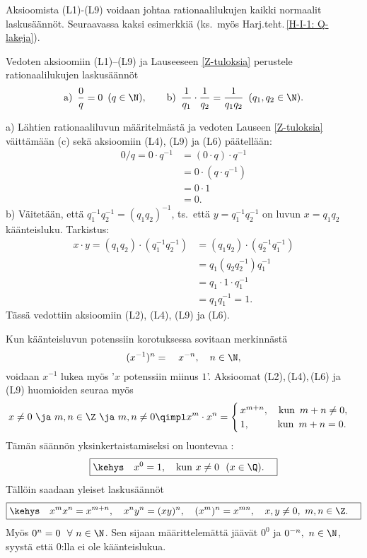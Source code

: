 Aksioomista (L1)-(L9) voidaan johtaa rationaalilukujen kaikki normaalit laskusäännöt.
Seuraavassa kaksi esimerkkiä (ks.\ myös Harj.teht.\,\ref{H-I-1: Q-lakeja}).
\begin{Exa} \label{kaksi Q-lakia}
Vedoten aksioomiin (L1)--(L9) ja Lauseeseen \ref{Z-tuloksia} perustele rationaalilukujen
laskusäännöt
\[
\text{a)}\,\ \frac{0}{q}=0\,\ (q\in\N), \qquad 
\text{b)}\,\ \frac{1}{q_1}\cdot\frac{1}{q_2} = \frac{1}{q_1q_2}\,\ (q_1,q_2\in\N).
\]
\end{Exa}
\ratk a) Lähtien rationaaliluvun määritelmästä ja vedoten Lauseen \ref{Z-tuloksia}
väittämään (c) sekä aksioomiin (L4), (L9) ja (L6) päätellään:
\begin{align*}
0/q = 0 \cdot q^{-1} &= (0 \cdot q)\cdot q^{-1} \\
                     &= 0\cdot(q \cdot q^{-1}) \\
                     &= 0 \cdot 1 \\
                     &= 0.
\end{align*}
b) Väitetään, että $q_1^{-1}q_2^{-1}=(q_1q_2)^{-1}$, ts.\ että $y=q_1^{-1}q_2^{-1}$ on luvun
$x=q_1q_2$ käänteisluku. Tarkistus:
\begin{align*}
x \cdot y = (q_1q_2)\cdot(q_1^{-1}q_2^{-1}) &= (q_1q_2)\cdot(q_2^{-1}q_1^{-1}) \\
                                            &= q_1(q_2q_2^{-1})q_1^{-1} \\
                                            &= q_1 \cdot 1 \cdot q_1^{-1} \\
                                            &= q_1q_1^{-1} = 1. 
\end{align*}
Tässä vedottiin aksioomiin (L2), (L4), (L9) ja (L6). \loppu

Kun käänteisluvun potenssiin korotuksessa sovitaan merkinnästä
\[
(x^{-1})^n = \quad x^{-n}, \quad n \in \N,
\]
voidaan $x^{-1}$ lukea myös '$x$ potenssiin miinus $1$'. Aksioomat (L2),\,(L4),\,(L6) ja (L9)
huomioiden seuraa myös 
\[
x \neq 0\ \ja\ m,n \in \Z\ \ja\ m,n \neq 0 
                         \qimpl x^m \cdot x^n = \begin{cases}
                                                \,x^{m+n}, \quad \text{kun}\,\ m+n \neq 0, \\
                                                \,1, \quad\quad\,\ \ \text{kun}\,\ m+n = 0.
                                                \end{cases}
\]
Tämän säännön yksinkertaistamiseksi on luontevaa :
\[
\boxed{\kehys\quad x^0 = 1, \quad \text{kun}\ x \neq 0\ \ (x\in\Q). \quad }
\]
Tällöin saadaan yleiset laskusäännöt
\[
\boxed{\kehys \quad x^mx^n=x^{m+n}, \quad x^ny^n=(xy)^n, \quad (x^m)^n=x^{mn}, 
                                                         \quad x,y \neq 0,\ m,n\in\Z. \quad} 
\]
Myös $0^n = 0 \ \ \forall\ n \in \N$. Sen sijaan määrittelemättä jäävät $0^0$ ja 
$0^{-n},\ n \in \N$, syystä että $0$:lla ei ole käänteislukua.
% 

